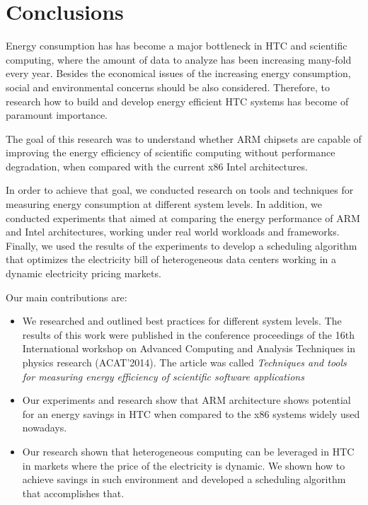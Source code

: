 \chapter{Conclusions}

Energy consumption has has become a major bottleneck in HTC and scientific computing, where the amount of data to analyze has been increasing many-fold every year. Besides the economical issues of the increasing energy consumption, social and environmental concerns should be also considered. Therefore, to research how to build and develop energy efficient HTC systems has become of paramount importance.

The goal of this research was to understand whether ARM chipsets are capable of improving the energy efficiency of scientific computing without performance degradation, when compared with the current x86 Intel architectures.

In order to achieve that goal, we conducted research on tools and techniques for measuring energy consumption at different system levels. In addition, we conducted experiments that aimed at comparing the energy performance of ARM and Intel architectures, working under real world workloads and frameworks. Finally, we used the results of the experiments to develop a scheduling algorithm that optimizes the electricity bill of heterogeneous data centers working in a dynamic electricity pricing markets. 

\vspace{5mm}

Our main contributions are: 

\begin{itemize}
  \item We researched and outlined best practices for different system levels. The results of this work were published in the conference proceedings of the 16th International workshop on Advanced Computing and Analysis Techniques in physics research (ACAT'2014). The article was called \textit{Techniques and tools for measuring energy efficiency of scientific software applications}

  \item Our experiments and research show that ARM architecture shows potential for an energy savings in HTC when compared to the x86 systems widely used nowadays. 

  \item Our research shown that heterogeneous computing can be leveraged in HTC in markets where the price of the electricity is dynamic. We shown how to achieve savings in such environment and developed a scheduling algorithm that accomplishes that.
\end{itemize}
